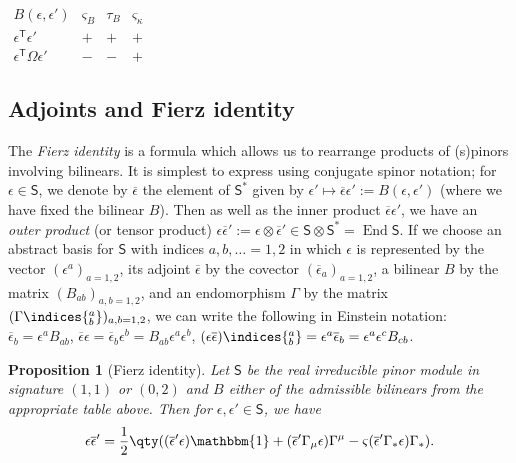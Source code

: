 \documentclass[10pt,a4paper]{amsart}
\numberwithin{equation}{section}
\newtheorem{Proposition}[Theorem]{Proposition}
 { \theoremstyle{definition}
\newtheorem{Definition}[Theorem]{Definition}
\newtheorem{Note}[Theorem]{Note}
\newtheorem{Example}[Theorem]{Example}
\newtheorem{Remark}[Theorem]{Remark} }
\newcommand{\ssS}{\mathsf{S}}
\newcommand{\1}{\mathbbm{1}}
\DeclareMathOperator{\End}{End}
\begin{document}
\begin{table}[t]
\centering
	\caption{Properties of admissible bilinears and their Dirac currents in signature $(0,2)$.}
	\label{table:(0,2)-admissible-bilinears}
	\setlength{\extrarowheight}{.75ex}
	$\begin{array}{c|ccc}
		B(\epsilon,\epsilon')	& \varsigma_B	& \tau_B & \varsigma_\kappa	\\
		\hline
		\epsilon^{\mathsf{T}}\epsilon'	& +	& + & +	\\
		\epsilon^{\mathsf{T}}\Omega\epsilon'	& -	& - & +
	\end{array}$
\end{table}

\subsection{Adjoints and Fierz identity}

The \emph{Fierz identity} is a formula which allows us to rearrange products of (s)pinors involving bilinears. It is simplest to express using conjugate spinor notation; for $\epsilon\in \ssS$, we denote by $\overline\epsilon$ the element of $\ssS^*$ given by $\epsilon'\mapsto\overline\epsilon\epsilon':=B(\epsilon,\epsilon')$ (where we have fixed the bilinear $B$). Then as well as the inner product $\overline\epsilon\epsilon'$, we have an \emph{outer product} (or tensor product) $\epsilon\overline\epsilon':=\epsilon\otimes\overline\epsilon'\in \ssS\otimes \ssS^*=\End \ssS$. If we choose an abstract basis for $\ssS$ with indices $a,b,\ldots=1,2$ in which $\epsilon$ is represented by the vector $(\epsilon^a)_{a=1,2}$, its adjoint $\overline\epsilon$ by the covector $(\overline\epsilon_a)_{a=1,2}$, a bilinear $B$ by the matrix $(B_{ab})_{a,b=1,2}$, and an endomorphism $\Gamma$ by the matrix $(\Gamma\indices{^a_b})_{a,b=1,2}$, we can write the following in Einstein notation:
$
	\overline{\epsilon}_b = \epsilon^a B_{ab}$,
	$\overline{\epsilon}\epsilon = \overline{\epsilon}_b\epsilon^b = B_{ab}\epsilon^a\epsilon^b$,
	$(\epsilon\overline{\epsilon})\indices{^a_b} = \epsilon^a\overline{\epsilon}_b = \epsilon^a \epsilon^c B_{cb}$.

\begin{Proposition}[Fierz identity] \label{prop:2d-fierz}
	Let $\ssS$ be the real irreducible pinor module in signature $(1,1)$ or $(0,2)$ and $B$ either of the admissible bilinears from the appropriate table above. Then for $\epsilon,\epsilon'\in \ssS$, we have
\[
		\epsilon\overline\epsilon' = \frac{1}{2}\qty((\overline\epsilon'\epsilon)\1 + (\overline\epsilon'\Gamma_\mu\epsilon)\Gamma^\mu - \varsigma(\overline\epsilon'\Gamma_*\epsilon)\Gamma_*).
\]
\end{Proposition}
\end{document}

